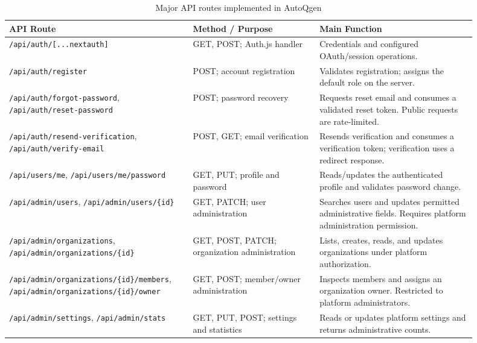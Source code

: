 \begin{table}[H]
    \centering
    \caption{Major API routes implemented in AutoQgen}
    \label{tab:api-route-inventory}
    \begin{tabular}{|p{0.34\linewidth}|p{0.25\linewidth}|p{0.31\linewidth}|}
        \hline
        \textbf{API Route} & \textbf{Method / Purpose} & \textbf{Main Function} \\
        \hline
        \texttt{/api/auth/[...nextauth]} & GET, POST; Auth.js handler & Credentials and configured OAuth/session operations. \\
        \hline
        \texttt{/api/auth/register} & POST; account registration & Validates registration; assigns the default role on the server. \\
        \hline
        \texttt{/api/auth/forgot-password}, \texttt{/api/auth/reset-password} & POST; password recovery & Requests reset email and consumes a validated reset token. Public requests are rate-limited. \\
        \hline
        \texttt{/api/auth/resend-verification}, \texttt{/api/auth/verify-email} & POST, GET; email verification & Resends verification and consumes a verification token; verification uses a redirect response. \\
        \hline
        \texttt{/api/users/me}, \texttt{/api/users/me/password} & GET, PUT; profile and password & Reads/updates the authenticated profile and validates password change. \\
        \hline
        \texttt{/api/admin/users}, \texttt{/api/admin/users/\{id\}} & GET, PATCH; user administration & Searches users and updates permitted administrative fields. Requires platform administration permission. \\
        \hline
        \texttt{/api/admin/organizations}, \texttt{/api/admin/organizations/\{id\}} & GET, POST, PATCH; organization administration & Lists, creates, reads, and updates organizations under platform authorization. \\
        \hline
        \texttt{/api/admin/organizations/\{id\}/members}, \texttt{/api/admin/organizations/\{id\}/owner} & GET, POST; member/owner administration & Inspects members and assigns an organization owner. Restricted to platform administrators. \\
        \hline
        \texttt{/api/admin/settings}, \texttt{/api/admin/stats} & GET, PUT, POST; settings and statistics & Reads or updates platform settings and returns administrative counts. \\

\end{tabular}
\end{table}
